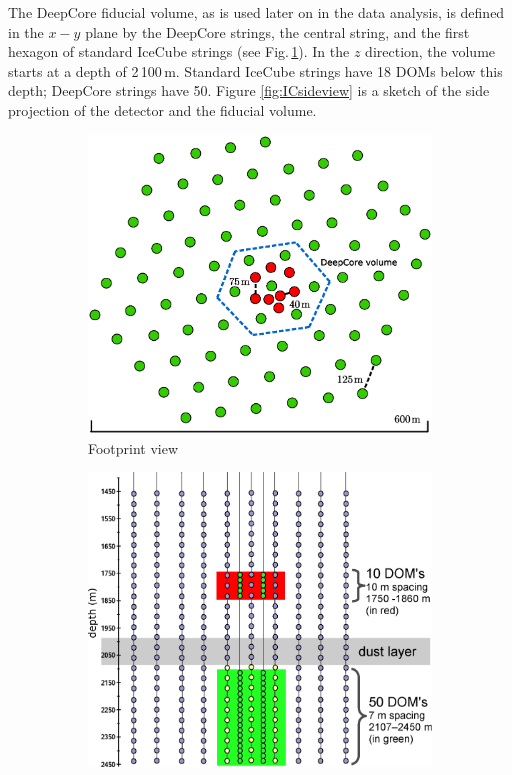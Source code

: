 \documentclass[../Main.tex]{subfiles}
\begin{document}
The DeepCore fiducial volume, as is used later on in the data analysis, is defined in the $x-y$ plane by the DeepCore strings, the central string, and the first hexagon of standard IceCube strings (see Fig.\,\ref{fig:ICgeometry}). In the $z$ direction, the volume starts at a depth of 2\,100\,m. Standard IceCube strings have 18 DOMs below this depth; DeepCore strings have 50. Figure \ref{fig:ICsideview} is a sketch of the side projection of the detector and the fiducial volume.

\begin{figure}[bth]
  \begin{subfigure}[c]{0.49\textwidth}
    \centering
    \includegraphics[width=\textwidth]{Geometry}
    \caption{Footprint view}
    \label{fig:ICgeometry}
  \end{subfigure}
  \hfill
  \begin{subfigure}[c]{0.49\textwidth}
    \centering
    \includegraphics[width=\textwidth]{DeepCoreNew}

\end{subfigure}
\end{figure}
\end{document}
